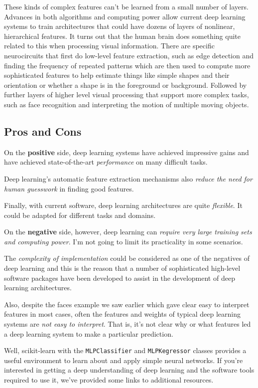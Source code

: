 \begin{multicols}{2}
These kinds of complex features can't be learned from a small number of layers. Advances in both algorithms and computing power allow current deep learning systems to train architectures that could have dozens of layers of nonlinear, hierarchical features. It turns out that the human brain does something quite related to this when processing visual information. There are specific neurocircuits that first do low-level feature extraction, such as edge detection and finding the frequency of repeated patterns which are then used to compute more sophisticated features to help estimate things like simple shapes and their orientation or whether a shape is in the foreground or background. Followed by further layers of higher level visual processing that support more complex tasks, such as face recognition and interpreting the motion of multiple moving objects.

\subsection{Pros and Cons}

On the \textbf{positive} side, deep learning systems have achieved impressive gains and have achieved state-of-the-art \emph{performance} on many difficult tasks. 

Deep learning's automatic feature extraction mechanisms also \emph{reduce the need for human guesswork} in finding good features. 

Finally, with current software, deep learning architectures are quite \emph{flexible}. It could be adapted for different tasks and domains. 

On the \textbf{negative} side, however, deep learning can \emph{require very large training sets and computing power}. I'm not going to limit its practicality in some scenarios. 

The \emph{complexity of implementation} could be considered as one of the negatives of deep learning and this is the reason that a number of sophisticated high-level software packages have been developed to assist in the development of deep learning architectures. 

Also, despite the faces example we saw earlier which gave clear easy to interpret features in most cases, often the features and weights of typical deep learning systems are \emph{not easy to interpret}. That is, it's not clear why or what features led a deep learning system to make a particular prediction. 

Well, scikit-learn with the \texttt{MLPСlassifier} and \texttt{MLPКegressor} classes provides a useful environment to learn about and apply simple neural networks. If you're interested in getting a deep understanding of deep learning and the software tools required to use it, we've provided some links to additional resources. 


\end{multicols}
